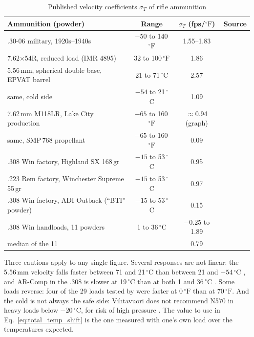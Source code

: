 \documentclass[11pt,twoside,openright]{report}
\newcommand{\degF}{\ensuremath{{}^{\circ}\mathrm{F}}}
\begin{document}
\begin{table}[H]
\centering
\caption{Published velocity coefficients $\sigma_T$ of rifle ammunition}
\label{tab:propellant_temp}
\footnotesize
\setlength{\tabcolsep}{4pt}
\begin{tabularx}{\textwidth}{@{}Xcc>{\raggedright\arraybackslash}p{3.1cm}@{}}
\toprule
\textbf{Ammunition (powder)} & \textbf{Range} & $\sigma_T$ \textbf{(fps/$\degF$)} & \textbf{Source} \\
\midrule
.30-06 military, 1920s--1940s & $-50$ to 140\,$\degF$ & 1.55--1.83 & \citet[p.~399]{hatcher1962notebook} \\
7.62$\times$54R, reduced load (IMR 4895) & 32 to 100\,$\degF$ & 1.86 & \citet{tyson2009nawcwd} \\
5.56\,mm, spherical double base, EPVAT barrel & 21 to 71\,$^\circ$C & 2.57 & \citet{boulkadid2016} \\
\quad same, cold side & $-54$ to 21\,$^\circ$C & 1.09 & \citet{boulkadid2016} \\
7.62\,mm M118LR, Lake City production & $-65$ to 160\,$\degF$ & $\approx$0.94 (graph) & \citet{faintich2010stmarks} \\
\quad same, SMP\,768 propellant & $-65$ to 160\,$\degF$ & 0.09 & \citet{faintich2010stmarks} \\
.308 Win factory, Highland SX 168\,gr & $-15$ to 53\,$^\circ$C & 0.95 & \citet{jackson2013outback} \\
.223 Rem factory, Winchester Supreme 55\,gr & $-15$ to 53\,$^\circ$C & 0.97 & \citet{jackson2013outback} \\
.308 Win factory, ADI Outback (``BTI'' powder) & $-15$ to 53\,$^\circ$C & 0.15 & \citet{jackson2013outback} \\
.308 Win handloads, 11 powders & 1 to 36\,$^\circ$C & $-0.25$ to 1.89 & \citet{castleman2022t308} \\
\quad median of the 11 & & 0.79 & \\
\bottomrule
\end{tabularx}
\end{table}

Three cautions apply to any single figure. Several responses are not linear: the 5.56\,mm velocity falls faster between 71 and 21\,$^\circ$C than between 21 and $-54$\,$^\circ$C \citep{boulkadid2016}, and AR-Comp in the .308 is slower at 19\,$^\circ$C than at both 1 and 36\,$^\circ$C \citep{castleman2022t308}. Some loads reverse: four of the 29 loads tested by \citet{barsness2017temp} were faster at 0\,$\degF$ than at 70\,$\degF$. And the cold is not always the safe side: Vihtavuori does not recommend N570 in heavy loads below $-20$\,$^\circ$C, for risk of high pressure \citep[p.~14]{vihtavuori2026}. The value to use in Eq.~\eqref{eq:total_temp_shift} is the one measured with one's own load over the temperatures expected.
\end{document}

